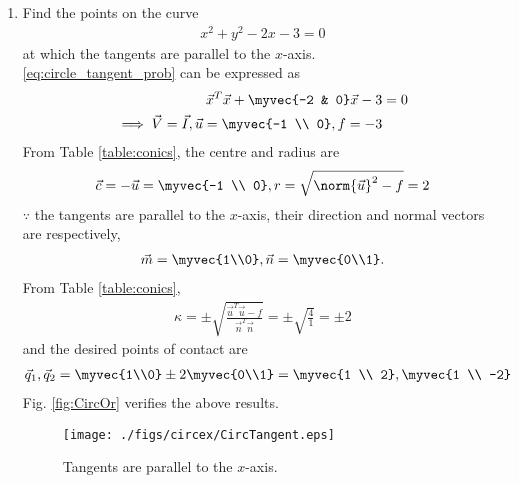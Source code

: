 \begin{enumerate}[label=\thesection.\arabic*.,ref=\thesection.\theenumi]
\item 
Find the points on the curve  
\begin{align}
x^2+y^2-2x-3 = 0
\label{eq:circle_tangent_prob}
\end{align}
at which the tangents are parallel to the $x$-axis.
\\
\solution \eqref{eq:circle_tangent_prob} can be expressed as
\begin{align}
\vec{x}^T\vec{x}+\myvec{-2 & 0}\vec{x}-3 &= 0
\label{eq:circle_tangent_prob_vec}
\\
\implies \vec{V} = \vec{I}, \vec{u} = \myvec{-1 \\ 0}, f = -3
\label{eq:circle_tangent_prob_uf}
\end{align}
From Table \ref{table:conics}, the centre and radius are
\begin{align}
\vec{c} = -\vec{u} = \myvec{-1 \\ 0}, r =\sqrt{\norm{\vec{u}}^2-f} = 2
\end{align}
$\because$ the tangents are parallel to the $x$-axis, their direction and normal vectors are respectively,
\begin{align}
\vec{m} = \myvec{1\\0},
\vec{n} = \myvec{0\\1}.
\end{align}
From Table \ref{table:conics},
\begin{align}
\kappa = \pm \sqrt{\frac{\vec{u}^T\vec{u}-f}{\vec{n}^T\vec{n}}} = \pm \sqrt{\frac{4}{1}} = \pm 2
\end{align}
and the desired points of contact are 
\begin{align}
\vec{q}_1, \vec{q}_2 = \myvec{1\\0}\pm 2\myvec{0\\1} =  
\myvec{1 \\  2},
\myvec{1 \\  -2}
\end{align}
%
Fig. \ref{fig:CircOr}	verifies the above results.
\begin{figure}[!ht]
\centering
\texttt{[image: ./figs/circex/CircTangent.eps]}
\caption{Tangents are parallel to the $x$-axis. }
\label{fig:CircTangent}	
\end{figure}

\end{enumerate}
